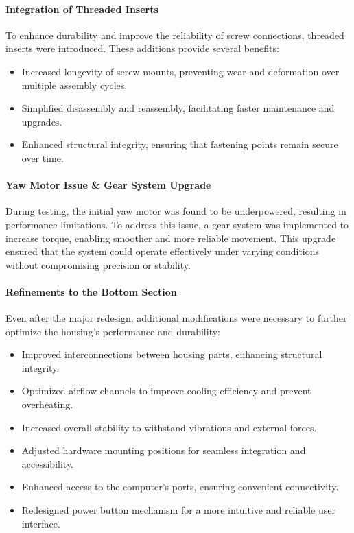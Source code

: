 \paragraph{Integration of Threaded Inserts}  
To enhance durability and improve the reliability of screw connections, threaded inserts were introduced. These additions provide several benefits:  
\begin{itemize}  
	\item Increased longevity of screw mounts, preventing wear and deformation over multiple assembly cycles.  
	\item Simplified disassembly and reassembly, facilitating faster maintenance and upgrades.  
	\item Enhanced structural integrity, ensuring that fastening points remain secure over time.  
\end{itemize}  

\paragraph{Yaw Motor Issue \& Gear System Upgrade}  
During testing, the initial yaw motor was found to be underpowered, resulting in performance limitations. To address this issue, a gear system was implemented to increase torque, enabling smoother and more reliable movement. This upgrade ensured that the system could operate effectively under varying conditions without compromising precision or stability.  

\paragraph{Refinements to the Bottom Section}  
Even after the major redesign, additional modifications were necessary to further optimize the housing’s performance and durability:  
\begin{itemize}  
	\item Improved interconnections between housing parts, enhancing structural integrity.  
	\item Optimized airflow channels to improve cooling efficiency and prevent overheating.  
	\item Increased overall stability to withstand vibrations and external forces.  
	\item Adjusted hardware mounting positions for seamless integration and accessibility.  
	\item Enhanced access to the computer’s ports, ensuring convenient connectivity.  
	\item Redesigned power button mechanism for a more intuitive and reliable user interface.  
\end{itemize}  

